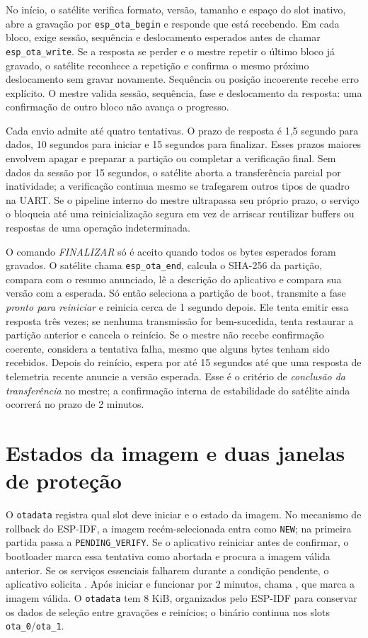 No início, o satélite verifica formato, versão, tamanho e espaço do slot inativo, abre a gravação por \texttt{esp\_ota\_begin} e responde que está recebendo. Em cada bloco, exige sessão, sequência e deslocamento esperados antes de chamar \texttt{esp\_ota\_write}. Se a resposta se perder e o mestre repetir o último bloco já gravado, o satélite reconhece a repetição e confirma o mesmo próximo deslocamento sem gravar novamente. Sequência ou posição incoerente recebe erro explícito. O mestre valida sessão, sequência, fase e deslocamento da resposta: uma confirmação de outro bloco não avança o progresso.

Cada envio admite até quatro tentativas. O prazo de resposta é 1,5 segundo para dados, 10 segundos para iniciar e 15 segundos para finalizar. Esses prazos maiores envolvem apagar e preparar a partição ou completar a verificação final. Sem dados da sessão por 15 segundos, o satélite aborta a transferência parcial por inatividade; a verificação continua mesmo se trafegarem outros tipos de quadro na UART. Se o pipeline interno do mestre ultrapassa seu próprio prazo, o serviço o bloqueia até uma reinicialização segura em vez de arriscar reutilizar buffers ou respostas de uma operação indeterminada.

O comando \emph{FINALIZAR} só é aceito quando todos os bytes esperados foram gravados. O satélite chama \texttt{esp\_ota\_end}, calcula o SHA-256 da partição, compara com o resumo anunciado, lê a descrição do aplicativo e compara sua versão com a esperada. Só então seleciona a partição de boot, transmite a fase \emph{pronto para reiniciar} e reinicia cerca de 1 segundo depois. Ele tenta emitir essa resposta três vezes; se nenhuma transmissão for bem-sucedida, tenta restaurar a partição anterior e cancela o reinício. Se o mestre não recebe confirmação coerente, considera a tentativa falha, mesmo que alguns bytes tenham sido recebidos. Depois do reinício, espera por até 15 segundos até que uma resposta de telemetria recente anuncie a versão esperada. Esse é o critério de \emph{conclusão da transferência} no mestre; a confirmação interna de estabilidade do satélite ainda ocorrerá no prazo de 2 minutos.

\section{Estados da imagem e duas janelas de proteção}
O \texttt{otadata} registra qual slot deve iniciar e o estado da imagem. No mecanismo de rollback do ESP-IDF, a imagem recém-selecionada entra como \texttt{NEW}; na primeira partida passa a \texttt{PENDING\_VERIFY}. Se o aplicativo reiniciar antes de confirmar, o bootloader marca essa tentativa como abortada e procura a imagem válida anterior. Se os serviços essenciais falharem durante a condição pendente, o aplicativo solicita . Após iniciar e funcionar por 2 minutos, chama , que marca a imagem válida. O \texttt{otadata} tem 8 KiB, organizados pelo ESP-IDF para conservar os dados de seleção entre gravações e reinícios; o binário continua nos slots \texttt{ota\_0}/\texttt{ota\_1}.


